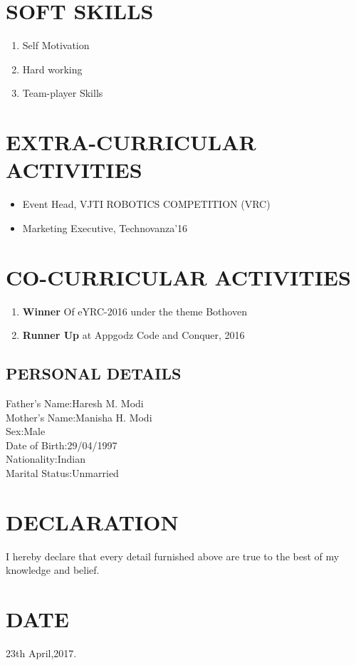 \documentclass[11pt,a4paper,sans]{moderncv}
\begin{document}
	\section{SOFT SKILLS}
	\begin{enumerate}
		\item {Self Motivation}
		\item {Hard working}
		\item {Team-player Skills}
		
	\end{enumerate}
	\section{EXTRA-CURRICULAR ACTIVITIES}
	\begin{itemize}
		\item {Event Head, VJTI ROBOTICS COMPETITION (VRC)}
		\item {Marketing Executive, Technovanza'16}
	\end{itemize}
	\section{CO-CURRICULAR ACTIVITIES}
	\begin{enumerate}
		\item{\textbf{Winner} Of eYRC-2016 under the theme Bothoven}
		\item{\textbf{Runner Up} at Appgodz Code and Conquer, 2016}
	\end{enumerate}
	\begin{flushleft}
		\section{PERSONAL DETAILS}
		Father's Name:\hspace{0.1in}Haresh M. Modi\\	
		Mother's Name:\hspace{0.06in}Manisha H. Modi\\
		Sex:\hspace{0.78in}Male\\
		Date of Birth:\hspace{0.16in}29/04/1997\\
		Nationality:\hspace{0.3in}Indian\\
		Marital Status:\hspace{0.1in}Unmarried\\
	\end{flushleft}
	\section{DECLARATION}
	I hereby declare that every detail furnished above are true to the best of my knowledge and belief.
	\section{DATE}
	23th April,2017.
	
\end{document}
